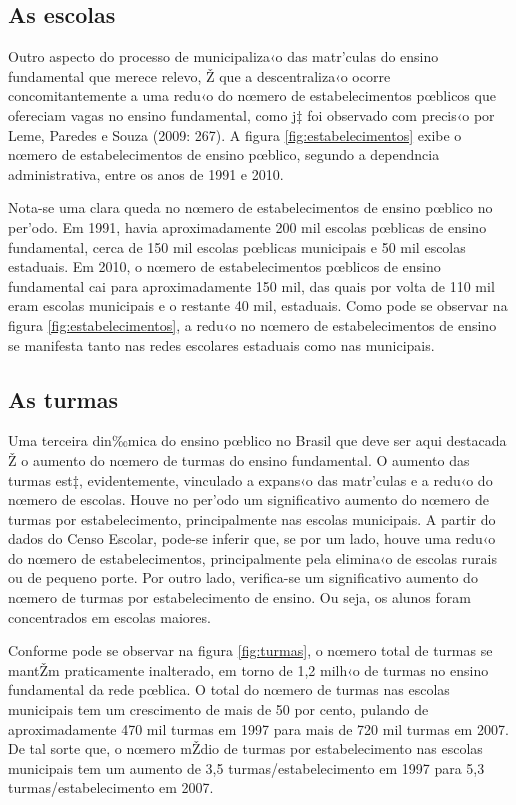 \documentclass[a4paper, 12pt]{article}
\begin{document}
\subsection{As escolas}


Outro aspecto do processo de municipaliza‹o das matr’culas do ensino fundamental que merece relevo, Ž que a descentraliza‹o ocorre concomitantemente a uma redu‹o do nœmero de estabelecimentos pœblicos que ofereciam vagas no ensino fundamental, como j‡ foi observado com precis‹o por Leme, Paredes e Souza (2009: 267). A figura \ref{fig:estabelecimentos} exibe o nœmero de estabelecimentos de ensino pœblico, segundo a dependncia administrativa, entre os anos de 1991 e 2010.


Nota-se uma clara queda no nœmero de estabelecimentos de ensino pœblico no per’odo. Em 1991, havia aproximadamente 200 mil escolas pœblicas de ensino fundamental, cerca de 150 mil escolas pœblicas municipais e 50 mil escolas estaduais. Em 2010, o nœmero de estabelecimentos pœblicos de ensino fundamental cai para aproximadamente 150 mil, das quais por volta de 110 mil eram escolas municipais e o restante 40 mil, estaduais. Como pode se observar na figura  \ref{fig:estabelecimentos}, a redu‹o no nœmero de estabelecimentos de ensino se manifesta tanto nas redes escolares estaduais como nas municipais.


\subsection{As turmas}


Uma terceira din‰mica do ensino pœblico no Brasil que deve ser aqui destacada Ž o aumento do nœmero de turmas do ensino fundamental. O aumento das turmas est‡, evidentemente, vinculado a expans‹o das matr’culas e a redu‹o do nœmero de escolas. Houve no per’odo um significativo aumento do nœmero de turmas por estabelecimento, principalmente nas escolas municipais. A partir do dados do Censo Escolar, pode-se inferir que, se por um lado, houve uma redu‹o do nœmero de estabelecimentos, principalmente pela elimina‹o de escolas rurais ou de pequeno porte. Por outro lado, verifica-se um significativo aumento do nœmero de turmas por estabelecimento de ensino. Ou seja, os alunos foram concentrados em escolas maiores.

Conforme pode se observar na figura \ref{fig:turmas}, o nœmero total de turmas se mantŽm praticamente inalterado, em torno de 1,2 milh‹o de turmas no ensino fundamental da rede pœblica. O total do nœmero de turmas nas escolas municipais tem um crescimento de mais de 50 por cento, pulando de aproximadamente 470 mil turmas em 1997 para mais de 720 mil turmas em 2007. De tal sorte que, o nœmero mŽdio de turmas por estabelecimento nas escolas municipais tem um aumento de 3,5 turmas/estabelecimento em 1997 para 5,3 turmas/estabelecimento em 2007.
\end{document}
